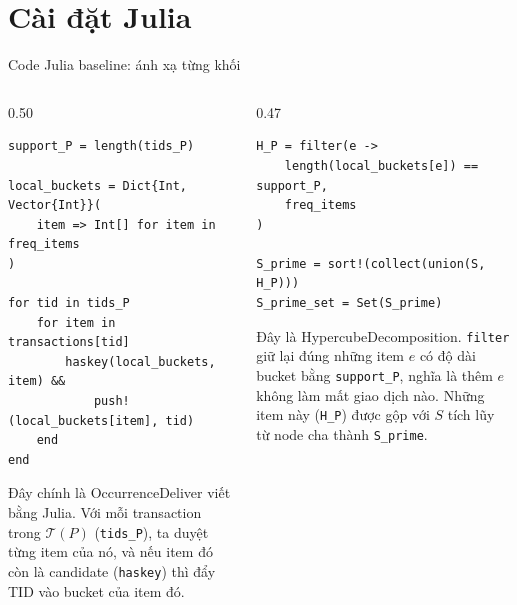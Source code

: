 \documentclass[9pt, aspectratio=169]{beamer}
\begin{document}
\section{Cài đặt Julia}
\begin{frame}[fragile]{Code Julia baseline: ánh xạ từng khối}
  \begin{columns}[T,onlytextwidth]
    \begin{column}{0.50\textwidth}
\begin{lstlisting}
support_P = length(tids_P)

local_buckets = Dict{Int, Vector{Int}}(
    item => Int[] for item in freq_items
)

for tid in tids_P
    for item in transactions[tid]
        haskey(local_buckets, item) &&
            push!(local_buckets[item], tid)
    end
end
\end{lstlisting}
      \small Đây chính là OccurrenceDeliver viết bằng Julia. Với mỗi
      transaction trong $\mathcal T(P)$ (\texttt{tids\_P}), ta duyệt từng
      item của nó, và nếu item đó còn là candidate (\texttt{haskey}) thì
      đẩy TID vào bucket của item đó.
    \end{column}

    \begin{column}{0.47\textwidth}
\begin{lstlisting}
H_P = filter(e ->
    length(local_buckets[e]) == support_P,
    freq_items
)

S_prime = sort!(collect(union(S, H_P)))
S_prime_set = Set(S_prime)
\end{lstlisting}
      \small Đây là HypercubeDecomposition. \texttt{filter} giữ lại đúng
      những item $e$ có độ dài bucket bằng \texttt{support\_P}, nghĩa là
      thêm $e$ không làm mất giao dịch nào. Những item này (\texttt{H\_P})
      được gộp với $S$ tích lũy từ node cha thành \texttt{S\_prime}.
    \end{column}
  \end{columns}
\end{frame}
\end{document}

